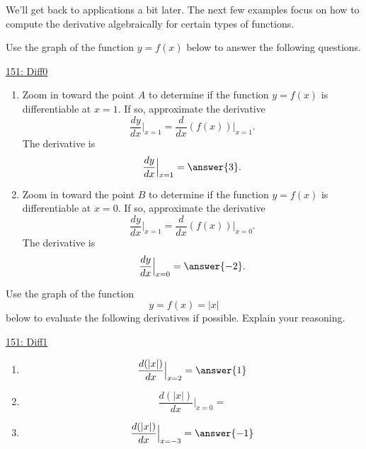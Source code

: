 \documentclass{ximera}
\begin{document}
We'll get back to applications a bit later. The next few examples focus on how to compute the derivative algebraically for certain types of functions.



\begin{exploration}  \label{Exp:34gt4trt}
Use the graph of the function $y=f(x)$ below to answer the following questions.

\begin{onlineOnly}
    \begin{center}
\end{center}
\end{onlineOnly}

\href{https://www.desmos.com/calculator/ojdj4r3r9v}{151: Diff0}

\begin{enumerate}
\item Zoom in toward the point $A$ to determine if the function $y=f(x)$ is differentiable at $x=1$. If so, approximate the derivative
\[
      \frac{dy}{dx}\Big|_{x=1} = \frac{d}{dx}\left( f(x) \right) \Big|_{x=1}.
\]
The derivative is
\[
       \frac{dy}{dx}\Big|_{x=1} = \answer{3} .
\]

\item Zoom in toward the point $B$ to determine if the function $y=f(x)$ is differentiable at $x=0$. If so, approximate the derivative
\[
      \frac{dy}{dx}\Big|_{x=1} = \frac{d}{dx}\left( f(x) \right) \Big|_{x=0}.
\]
The derivative is
\[
       \frac{dy}{dx}\Big|_{x=0} = \answer{-2} .
\]
\end{enumerate}


\end{exploration}


\begin{exploration}  \label{Exp9485rf5r}

Use the graph of the function 
\[
    y = f(x) = |x|
\]
below to evaluate the following derivatives if possible. Explain your reasoning.

\begin{onlineOnly}
    \begin{center}
\end{center}
\end{onlineOnly}

\href{https://www.desmos.com/calculator/us2fruzbra}{151: Diff1}

\begin{enumerate}
\item 
\[
 \frac{d (|x|)}{dx}\Big|_{x=2} = \answer{1}
\]

\item 
\[
 \frac{d (|x|)}{dx}\Big|_{x=0} = 
\]

\item 
\[
 \frac{d (|x|)}{dx}\Big|_{x=-3} = \answer{-1}
\]
\end{enumerate}
\end{exploration}
\end{document}
